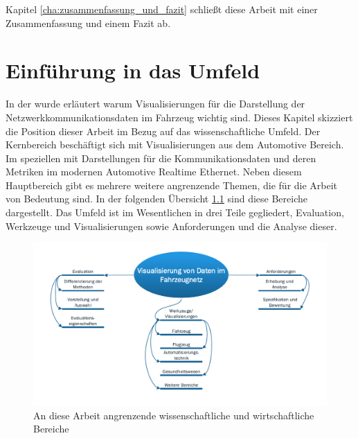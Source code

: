 \documentclass[draft=false
              ,paper=a4
              ,twoside=false
              ,fontsize=11pt
              ,headsepline
              ,BCOR10mm
              ,DIV11
              ]{scrbook}
\newcommand{\TODO}[1]{\colorbox{yellow}{\textcolor{red}{[TODO: #1]}}}
\begin{document}
%
 Kapitel \ref{cha:zusammenfassung_und_fazit} schließt diese Arbeit mit einer Zusammenfassung und einem Fazit ab.

\chapter{Einführung in das Umfeld} %
\label{cha:einfuhrung_in_das_umfeld}
In der  wurde erläutert warum Visualisierungen für die Darstellung der Netzwerkkommunikationsdaten im Fahrzeug wichtig sind. Dieses Kapitel skizziert die Position dieser Arbeit im Bezug auf das wissenschaftliche Umfeld. Der Kernbereich beschäftigt sich mit Visualisierungen aus dem Automotive Bereich. Im speziellen mit Darstellungen für die Kommunikationsdaten und deren Metriken im modernen Automotive Realtime Ethernet. Neben diesem Hauptbereich gibt es mehrere weitere angrenzende Themen, die für die Arbeit von Bedeutung sind. In der folgenden Übersicht \ref{fig:theme_overview} sind diese Bereiche dargestellt. Das Umfeld ist im Wesentlichen in drei Teile gegliedert, Evaluation, Werkzeuge und Visualisierungen sowie Anforderungen und die Analyse dieser. 

\begin{figure}[htbp]
  \centering
  \includegraphics[width=\textwidth]{img/theme_overview.pdf}
  \caption{An diese Arbeit angrenzende wissenschaftliche und wirtschaftliche Bereiche}
  \label{fig:theme_overview}
\end{figure}
\end{document}
